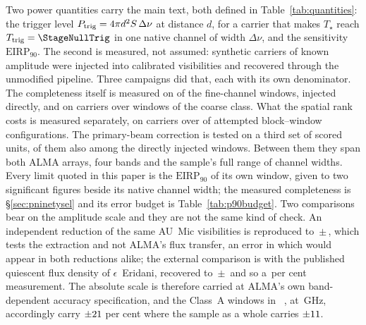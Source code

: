 Two power quantities carry the main text, both defined in
Table~\ref{tab:quantities}: the trigger level $P_{\rm trig} = 4\pi
d^{2}S\,\Delta\nu$ at distance $d$, for a carrier that makes $T_\star$ reach
$T_{\rm trig}=\StageNullTrig$ in one native channel of width $\Delta\nu$,
and the sensitivity $\mathrm{EIRP}_{90}$. The second is measured, not
assumed: synthetic carriers of known amplitude were injected into
calibrated visibilities and recovered through the unmodified pipeline.
Three campaigns did that, each with its own denominator. The completeness
itself is measured on
\MkInjCompWin{} of the \MkInjCompDenom{} fine-channel windows, injected
directly, and on \SensNToneCoarse{} carriers over \SensNInjCoarse{} windows
of the coarse class. What the spatial rank costs is measured separately, on
\SelNTone{} carriers over \MkInjSelUnit{} of \MkInjSelTotal{} attempted
block--window configurations. The primary-beam correction is tested on a
third set of \MkInjBeamUnit{} scored units, \MkInjBeamShared{} of them also
among the directly injected windows. Between them they span both ALMA
arrays, four bands and the sample's full range of
channel widths. Every limit quoted in
this paper is the $\mathrm{EIRP}_{90}$ of its own window, given to two
significant figures beside its native channel width; the measured
completeness is \S\ref{sec:pninetysel} and its error
budget is Table~\ref{tab:p90budget}. Two comparisons bear on the amplitude
scale and they are not the same kind of check. An independent reduction of
the same AU~Mic visibilities is reproduced to
\PxJanRatio\,$\pm$\,\PxJanRatioErr, which tests the extraction and not
ALMA's flux transfer, an error in which would appear in both reductions
alike; the external comparison is with the published quiescent flux
density of $\epsilon$~Eridani, recovered to
\PxEpsRatio\,$\pm$\,\PxEpsRatioErr{} \citep{Burton2022} and so a
\SbEpsPct\,per cent measurement. The absolute scale is therefore carried
at ALMA's own band-dependent accuracy specification, and the \BudNHiWin{}
Class~A windows in \BudHiBandWord~\BudHiBands, at \BudHiGHzList\,GHz,
accordingly carry $\pm21$ per cent where the sample as a whole
carries $\pm11$.

